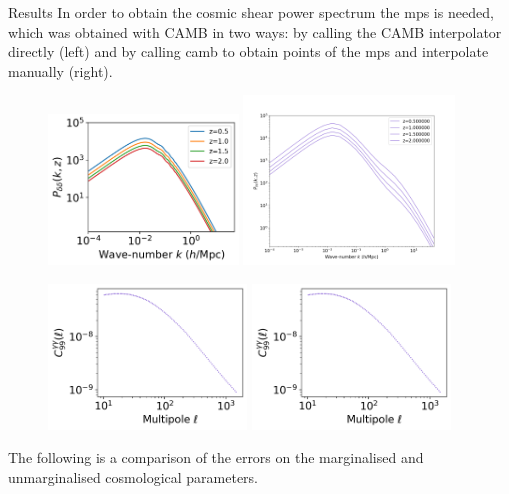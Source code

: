 \begin{frame}[t]
\begin{columns}[t]
\begin{column}{.465\textwidth}
\begin{block}{Results}
In order to obtain the cosmic shear power spectrum the mps is needed, which was obtained with CAMB \cite{p3} in two ways: by calling the CAMB interpolator directly (left) and by calling camb to obtain points of the mps and interpolate manually (right).
\begin{figure}
    \centering
    \includegraphics[width=0.45\textwidth]{fig_results/mps.png}
    \includegraphics[width=0.5\textwidth]{fig_results/MPS.png}
    \label{mps}
\end{figure}

\begin{figure}
    \centering
    \includegraphics[width=0.47\textwidth]{fig_results/CSPS.png}
    \includegraphics[width=0.47\textwidth]{fig_results/CSPS.png}
    \label{mps}
\end{figure}
The following is a comparison of the errors on the marginalised and unmarginalised cosmological parameters.


\end{block}
\end{column}
\end{columns}
\end{frame}
